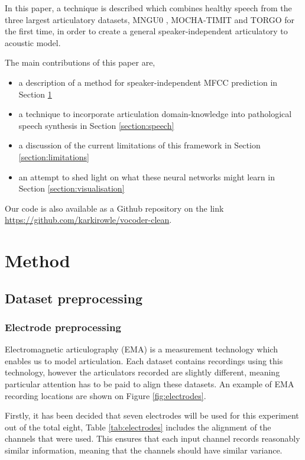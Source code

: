 \documentclass[a4paper]{article}
\begin{document}
In this paper, a technique is described which combines healthy speech
from the three largest articulatory datasets, MNGU0 \cite{Richmond2011},
MOCHA-TIMIT and TORGO \cite{Rudzicz2012} for the first time, in order to
create a general speaker-independent articulatory to acoustic model.

\vspace{1em}
The main contributions of this paper are,
\begin{itemize}
\itemsep0em
\item a description of a method for speaker-independent MFCC prediction in Section \ref{section:method}
\item a technique to incorporate articulation domain-knowledge into pathological
  speech synthesis in Section \ref{section:speech} 
\item a discussion of the current limitations of this framework in Section \ref{section:limitations}
\item an attempt to shed light on what these neural networks might learn in Section \ref{section:visualisation}
\end{itemize}

Our code is also available as a Github repository on the link
\url{https://github.com/karkirowle/vocoder-clean}.

\section{Method} \label{section:method}
\subsection{Dataset preprocessing}

\subsubsection{Electrode preprocessing}

Electromagnetic articulography (EMA) is a measurement technology
which enables us to model articulation. Each dataset contains recordings
using this technology, however the articulators recorded are slightly
different, meaning particular attention has to be paid to align these datasets.
An example of EMA recording locations are shown on Figure \ref{fig:electrodes}.

Firstly, it has been decided that seven electrodes will be used for this
experiment out of the total eight, Table \ref{tab:electrodes} includes
the alignment of the channels that were used. This ensures that each
input channel records reasonably similar information, meaning that the
channels should have similar variance.
\end{document}
